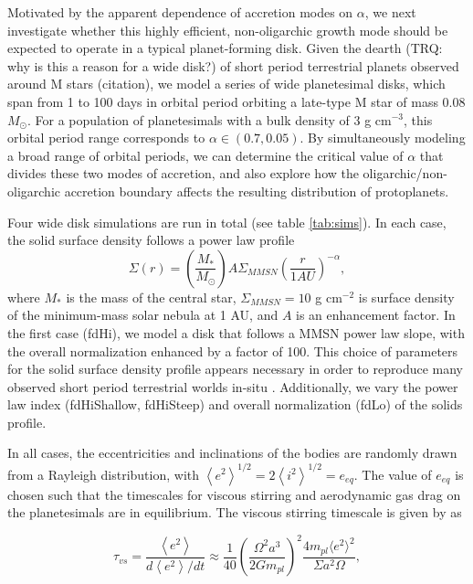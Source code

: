 \documentclass[twocolumn]{aastex63}
\begin{document}
Motivated by the apparent dependence of accretion modes on $\alpha$,
we next investigate whether this highly efficient, non-oligarchic
growth mode should be expected to operate in a typical planet-forming
disk. Given the dearth (TRQ: why is this a reason for a wide disk?) of short period terrestrial planets observed around M stars (citation), we model a series of wide planetesimal disks, which span from 1 to 100 days in orbital period orbiting a late-type M star of mass 0.08 $M_{\odot}$. For a population of planetesimals with a bulk density of 3 g cm$^{-3}$, this orbital period range corresponds to $\alpha \in (0.7, 0.05)$. By simultaneously modeling a broad range of orbital periods, we can determine the critical value of $\alpha$ that divides these two modes of accretion, and also explore how the oligarchic/non-oligarchic accretion boundary affects the resulting distribution of protoplanets.

Four wide disk simulations are run in total (see table \ref{tab:sims}). In each case, the solid surface density follows a power law profile
\begin{equation}
	\Sigma(r) = \left( \frac{M_{*}}{M_{\odot}} \right) A \Sigma_{MMSN} \left( \frac{r}{1 AU} \right)^{-\alpha},
\end{equation}
where $M_{*}$ is the mass of the central star, $\Sigma_{MMSN} = 10$ g cm$^{-2}$ is surface density of the minimum-mass solar nebula \citep{hayashi81} at 1 AU, and $A$ is an enhancement factor. In the first case (fdHi), we model a disk that follows a MMSN power law slope, with the overall normalization enhanced by a factor of 100. This choice of parameters for the solid surface density profile appears necessary in order to reproduce many observed short period terrestrial worlds in-situ \citep{hansen12}. Additionally, we vary the power law index (fdHiShallow, fdHiSteep) and overall normalization (fdLo) of the solids profile.

In all cases, the eccentricities and inclinations of the bodies are randomly drawn from a Rayleigh distribution, with $\left< e^{2} \right>^{1/2} = 2\left<i^{2} \right>^{1/2} = e_{eq}$. The value of $e_{eq}$ is chosen such that the timescales for viscous stirring and aerodynamic gas drag on the planetesimals are in equilibrium. The viscous stirring timescale is given by \citet{ida93} as

\begin{equation}\label{eq:vs_timescale}
    \tau_{vs}  = \frac{\left< e^2 \right>}{d \left< e^2 \right> / dt} \approx \frac{1}{40}\left(\frac{\Omega^{2} a^{3}}{2 G m_{pl}}\right)^{2} \frac{4 m_{pl} \langle e^{2} \rangle^{2}}{\Sigma a^{2} \Omega},
\end{equation}
\end{document}
